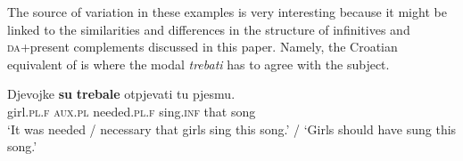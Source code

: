 \documentclass[output=paper,
modfonts,
newtxmath,
hidelinks,
]{langscibook}
\begin{document}
\ea \label{ex19}
	\z
\z

\noindent The source of variation in these examples is very interesting because it might be linked to the similarities and differences in the structure of infinitives and \textsc{da}+present complements discussed in this paper. Namely, the Croatian equivalent of  is  where the modal \textit{trebati} has to agree with the subject.

\ea \label{ex20}
\gll Djevojke \textbf{su} \textbf{trebale} otpjevati tu pjesmu.\\
     girl.\textsc{pl.f} \textsc{aux.pl} needed.\textsc{pl.f} sing.\textsc{inf} that song\\
\glt `It was needed / necessary that girls sing this song.' / `Girls should have sung this song.'
\z


\end{document}
